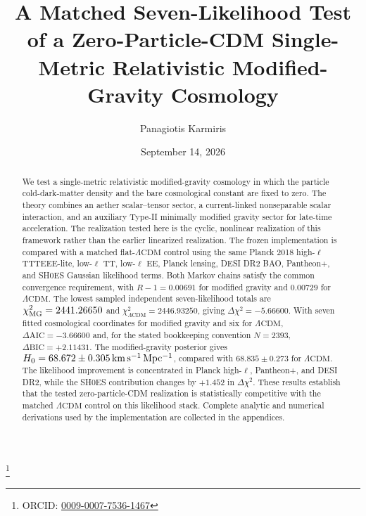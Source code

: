 \documentclass[aps,prd,twocolumn,superscriptaddress,nofootinbib,longbibliography,floatfix]{revtex4-2}
\newcommand{\LCDM}{\Lambda\mathrm{CDM}}
\begin{document}
\title{A Matched Seven-Likelihood Test of a Zero-Particle-CDM Single-Metric Relativistic Modified-Gravity Cosmology}

\author{Panagiotis Karmiris}
\thanks{ORCID: \href{https://orcid.org/0009-0007-7536-1467}{0009-0007-7536-1467}}

\date{September 14, 2026}

\begin{abstract}
We test a single-metric relativistic modified-gravity cosmology in which the particle cold-dark-matter density and the bare cosmological constant are fixed to zero. The theory combines an aether scalar--tensor sector, a current-linked nonseparable scalar interaction, and an auxiliary Type-II minimally modified gravity sector for late-time acceleration. The realization tested here is the cyclic, nonlinear realization of this framework rather than the earlier linearized realization. The frozen implementation is compared with a matched flat-$\LCDM$ control using the same Planck 2018 high-$\ell$ TTTEEE-lite, low-$\ell$ TT, low-$\ell$ EE, Planck lensing, DESI DR2 BAO, Pantheon+, and SH0ES Gaussian likelihood terms. Both Markov chains satisfy the common convergence requirement, with $R-1=0.00691$ for modified gravity and $0.00729$ for $\LCDM$. The lowest sampled independent seven-likelihood totals are $\chi^2_{\rm MG}=2441.26650$ and $\chi^2_{\LCDM}=2446.93250$, giving $\Delta\chi^2=-5.66600$. With seven fitted cosmological coordinates for modified gravity and six for $\LCDM$, $\Delta\mathrm{AIC}=-3.66600$ and, for the stated bookkeeping convention $N=2393$, $\Delta\mathrm{BIC}=+2.11431$. The modified-gravity posterior gives $H_0=68.672\pm0.305\,{\rm km\,s^{-1}\,Mpc^{-1}}$, compared with $68.835\pm0.273$ for $\LCDM$. The likelihood improvement is concentrated in Planck high-$\ell$, Pantheon+, and DESI DR2, while the SH0ES contribution changes by $+1.452$ in $\Delta\chi^2$. These results establish that the tested zero-particle-CDM realization is statistically competitive with the matched $\LCDM$ control on this likelihood stack. Complete analytic and numerical derivations used by the implementation are collected in the appendices.
\end{abstract}

\maketitle
\end{document}
